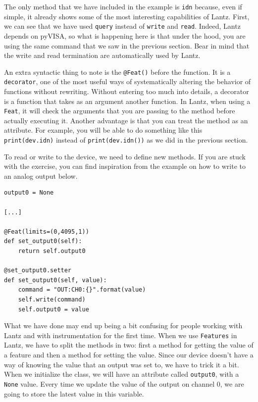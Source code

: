 The only method that we have included in the example is \texttt{idn} because, even if simple, it already shows some of the most interesting
capabilities of Lantz. First, we can see that we have used \texttt{query} instead of \texttt{write} and \texttt{read}. Indeed, Lantz depends on pyVISA, so what is happening here is that under the hood, you are using the same command that we saw in the previous section. Bear in mind that the write and read termination are automatically used by Lantz.

An extra syntactic thing to note is the \texttt{@Feat()} before the function. It is a \texttt{decorator}, one of the most useful ways of systematically altering the behavior of functions without rewriting. Without entering too much into details, a decorator is a function that takes as an argument another function. In Lantz, when using a \texttt{Feat}, it will check the arguments that you are passing to the method before actually executing it. Another advantage is that you can treat the method as an attribute. For example, you will be able to do something like this \texttt{print(dev.idn)} instead of \texttt{print(dev.idn())} as we did in the previous section.


To read or write to the device, we need to define new methods. If you are stuck with the exercise, you can find inspiration from the example on how to write to an analog output below.

\begin{verbatim}
output0 = None

[...]

@Feat(limits=(0,4095,1))
def set_output0(self):
    return self.output0

@set_output0.setter
def set_output0(self, value):
    command = "OUT:CH0:{}".format(value)
    self.write(command)
    self.output0 = value
\end{verbatim}

What we have done may end up being a bit confusing for people working with Lantz and with instrumentation for the first time. When we use \texttt{Features} in Lantz, we have to split the methods in two: first a method for getting the value of a feature and then a method for setting the value. Since our device doesn't have a way of knowing the value that an output was set to, we have to trick it a bit. When we initialize the class, we will have an attribute called \texttt{output0}, with a \texttt{None} value. Every time we update the value of the output on channel 0, we are going to store the latest value in this variable.

